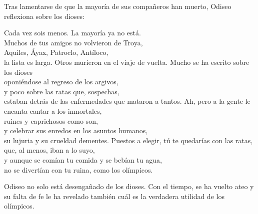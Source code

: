 Tras lamentarse de que la mayoría de sus compañeros han muerto, Odiseo reflexiona sobre los dioses:

\begin{versopropio}
Cada vez sois menos. La mayoría ya no está.\\
Muchos de tus amigos no volvieron de Troya,\\
Aquiles, Áyax, Patroclo, Antíloco,\\
la lista es larga. Otros murieron en el viaje de vuelta.
\stanzabreak
Mucho se ha escrito sobre los dioses\\
oponiéndose al regreso de los argivos,\\
y poco sobre las ratas que, sospechas,\\
estaban detrás de las enfermedades que mataron a tantos.
\stanzabreak
Ah, pero a la gente le encanta cantar a los inmortales,\\
ruines y caprichosos como son,\\
y celebrar sus enredos en los asuntos humanos,\\
su lujuria y su crueldad dementes.
\stanzabreak
Puestos a elegir, tú te quedarías con las ratas,\\
que, al menos, iban a lo suyo,\\
y aunque se comían tu comida y se bebían tu agua,\\
no se divertían con tu ruina, como los olímpicos.
\end{versopropio}

Odiseo no solo está desengañado de los dioses. Con el tiempo, se ha vuelto ateo y su falta de fe le ha revelado también cuál es la verdadera utilidad de los olímpicos.

